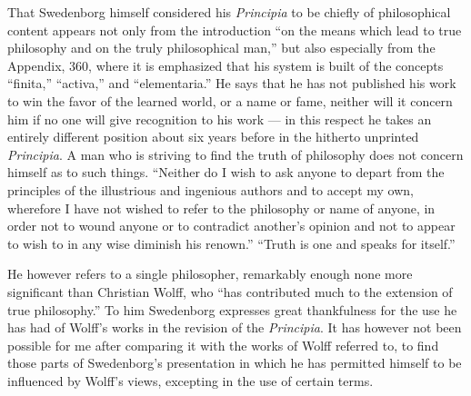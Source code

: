 \documentclass[a4paper, 11pt, oneside, polutonikogreek, english]{article}
\begin{document}
That Swedenborg himself considered his \emph{Principia} to be chiefly of philosophical content appears not only from the introduction ``on the means which lead to true philosophy and on the truly philosophical man,'' but also especially from the Appendix, 360, where it is emphasized that his system is built of the concepts ``finita,'' ``activa,'' and ``elementaria.'' He says that he has not published his work to win the favor of the learned world, or a name or fame, neither will it concern him if no one will give recognition to his work --- in this respect he takes an entirely different position about six years before in the hitherto unprinted \emph{Principia}. A man who is striving to find the truth of philosophy does not concern himself as to such things. ``Neither do I wish to ask anyone to depart from the principles of the illustrious and ingenious authors and to accept my own, wherefore I have not wished to refer to the philosophy or name of anyone, in order not to wound anyone or to contradict another's opinion and not to appear to wish to in any wise diminish his renown.'' ``Truth is one and speaks for itself.''

He however refers to a single philosopher, remarkably enough none more significant than Christian Wolff, who ``has contributed much to the extension of true philosophy.'' To him Swedenborg expresses great thankfulness for the use he has had of Wolff's works in the revision of the \emph{Principia}. It has however not been possible for me after comparing it with the works of Wolff referred to, to find those parts of Swedenborg's presentation in which he has permitted himself to be influenced by Wolff's views, excepting in the use of certain terms.
\end{document}
